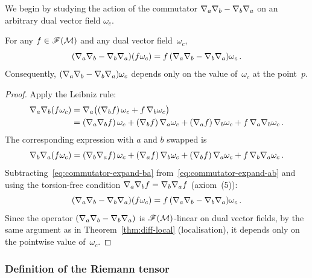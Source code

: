 We begin by studying the action of the commutator
$\nabla_a\nabla_b - \nabla_b\nabla_a$ on an arbitrary dual vector
field $\omega_c$.

\begin{theorem}\label{thm:commutator-local}
  For any $f\in\mathscr{F}(\mathcal{M})$ and any dual vector
  field~$\omega_c$,
  \begin{equation}\label{eq:commutator-f-omega}
    (\nabla_a\nabla_b - \nabla_b\nabla_a)(f\omega_c)
      = f\,(\nabla_a\nabla_b - \nabla_b\nabla_a)\omega_c\,.
  \end{equation}
  Consequently, $(\nabla_a\nabla_b - \nabla_b\nabla_a)\omega_c$
  depends only on the value of~$\omega_c$ at the point~$p$.
\end{theorem}

\begin{proof}
  Apply the Leibniz rule:
  \begin{align}
    \nabla_a\nabla_b(f\omega_c)
      &= \nabla_a\bigl((\nabla_b f)\,\omega_c
        + f\,\nabla_b\omega_c\bigr) \notag\\
      &= (\nabla_a\nabla_b f)\,\omega_c
        + (\nabla_b f)\,\nabla_a\omega_c
        + (\nabla_a f)\,\nabla_b\omega_c
        + f\,\nabla_a\nabla_b\omega_c\,.
        \label{eq:commutator-expand-ab}
  \end{align}
  The corresponding expression with $a$ and $b$ swapped is
  \begin{equation}\label{eq:commutator-expand-ba}
    \nabla_b\nabla_a(f\omega_c)
      = (\nabla_b\nabla_a f)\,\omega_c
        + (\nabla_a f)\,\nabla_b\omega_c
        + (\nabla_b f)\,\nabla_a\omega_c
        + f\,\nabla_b\nabla_a\omega_c\,.
  \end{equation}
  Subtracting~\eqref{eq:commutator-expand-ba}
  from~\eqref{eq:commutator-expand-ab} and using the
  torsion-free condition
  $\nabla_a\nabla_b f = \nabla_b\nabla_a f$ (axiom~(5)):
  \[
    (\nabla_a\nabla_b - \nabla_b\nabla_a)(f\omega_c)
      = f\,(\nabla_a\nabla_b - \nabla_b\nabla_a)\omega_c\,.
  \]
  Since the operator $(\nabla_a\nabla_b - \nabla_b\nabla_a)$ is
  $\mathscr{F}(\mathcal{M})$-linear on dual vector fields, by the same
  argument as in Theorem~\ref{thm:diff-local} (localisation), it
  depends only on the pointwise value of~$\omega_c$.
\end{proof}

\subsubsection{Definition of the Riemann tensor}%
\label{sec:riemann-def}

